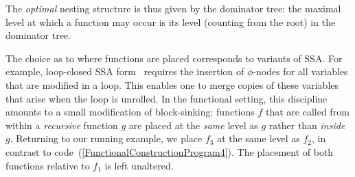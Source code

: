 The \emph{optimal} nesting structure is thus given by the dominator
tree: the maximal level at which a function may occur is its level
(counting from the root) in the dominator tree.

The choice as to where functions are placed corresponds to variants of
SSA. For example, loop-closed SSA
form~\cite{Chapter14GraphsAndGating,Chapter19LoopTree} requires the
insertion of $\phi$-nodes for all variables that are modified in a
loop. This enables one to merge copies of these variables that arise
when the loop is unrolled.  In the functional setting, this discipline
amounts to a small modification of block-sinking: functions $f$ that
are called from within a \emph{recursive} function $g$ are placed at
the \emph{same} level as $g$ rather than \emph{inside} $g$. Returning
to our running example, we place $f_3$ at the same level as $f_2$, in
contrast to code~(\ref{FunctionalConstructionProgram4}).  The
placement of both functions relative to $f_1$ is left unaltered.

